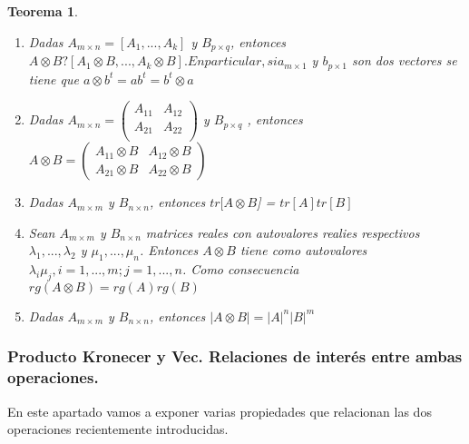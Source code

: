 \documentclass{article}
\theoremstyle{theorem-style}  %
\newtheorem{theorem}{Teorema}[section]  %
\theoremstyle{definition-style}
\theoremstyle{example-style}
\theoremstyle{exercise-style}
\begin{document}
\begin{theorem}
\begin{enumerate}
			\item \textit{Dadas $A_{m \times n} = [A_1, ..., A_k]$ y $B_{p \times q}$, entonces $A \otimes B ? [A_1 \otimes B, ..., A_k \otimes B]. En particular, si a_{m \times 1}$ y $b_{p \times 1}$ son dos vectores se tiene que $a \otimes b^t = ab^t = b^t \otimes a$ }
			
			\item \textit{Dadas $A_{m \times n} =\left( {\begin{array}{cc}
						A_{11} & A_{12}\\
						A_{21} & A_{22}\\
				\end{array}}\right)$ 			 y $B_{p \times q}$ , entonces $A \otimes B = \left( {\begin{array}{cc}
					A_{11} \otimes B & A_{12} \otimes B\\
					A_{21}  \otimes B & A_{22} \otimes B
					\end{array}}\right)  $}
			
			\item \textit{Dadas $A_{m \times m}$ y $B_{n \times n}$, entonces $tr[A \otimes B$] = $tr[A]tr[B]$}
			
			\item \textit{Sean $A_{m \times m}$ y $B_{n \times n}$ matrices reales con autovalores realies respectivos $\lambda_1, ..., \lambda_2$ y $\mu_1, ..., \mu_n$. Entonces $A \otimes B$ tiene como autovalores $\lambda_i \mu_j, i = 1, ..., m; j = 1,...,n$. Como consecuencia $rg(A \otimes B) = rg(A)rg(B)$}
			
			\item \textit{Dadas $A_{m \times m }$ y $B_{n \times n}$, entonces $|A \otimes B| = |A|^n |B|^m$}
			
			
		\end{enumerate}
	\end{theorem}
	
	
\subsubsection{Producto Kronecer y Vec. Relaciones de interés entre ambas operaciones.}
	
	En este apartado vamos a exponer varias propiedades que relacionan las dos operaciones recientemente introducidas.
	
\end{document}
